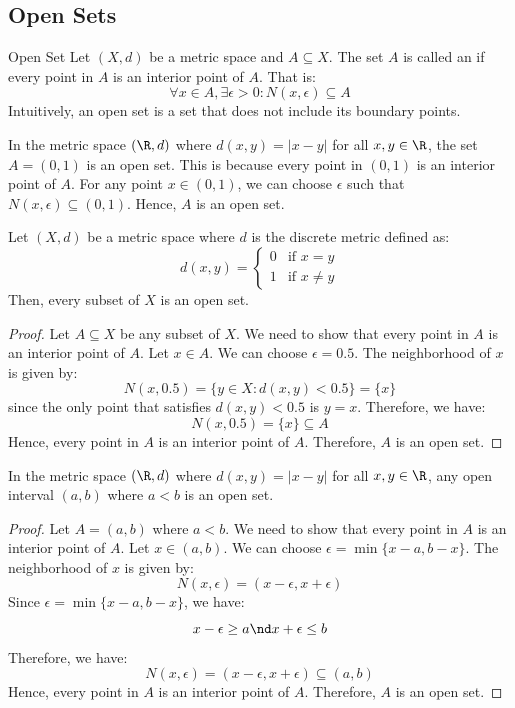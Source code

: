 \documentclass[openany]{book}
\begin{document}
\subsection{Open Sets}
\begin{mydefinition}{Open Set}
    Let $(X, d)$ be a metric space and $A \subseteq X$. The set $A$ is called an  if every point in $A$ is an interior point of $A$. That is:
    $$\forall x \in A, \exists \epsilon > 0: N(x, \epsilon) \subseteq A$$
    Intuitively, an open set is a set that does not include its boundary points.
\end{mydefinition}
\begin{example}
    In the metric space $(\R, d)$ where $d(x, y) = |x - y|$ for all $x, y \in \R$, the set $A = (0, 1)$ is an open set. This is because every point in $(0, 1)$ is an interior point of $A$. For any point $x \in (0, 1)$, we can choose $\epsilon$ such that $N(x, \epsilon) \subseteq (0, 1)$. Hence, $A$ is an open set.
\end{example}
\begin{mytheorem}
    Let $(X, d)$ be a metric space where $d$ is the discrete metric defined as:
    $$d(x, y) = 
    \begin{cases}
        0 & \text{if } x = y \\
        1 & \text{if } x \neq y
    \end{cases}$$
    Then, every subset of $X$ is an open set.
\end{mytheorem}
\begin{proof}
    Let $A \subseteq X$ be any subset of $X$. We need to show that every point in $A$ is an interior point of $A$. Let $x \in A$. We can choose $\epsilon = 0.5$. The neighborhood of $x$ is given by:
    $$N(x, 0.5) = \{y \in X: d(x, y) < 0.5\} = \{x\}$$
    since the only point that satisfies $d(x, y) < 0.5$ is $y = x$. Therefore, we have:
    $$N(x, 0.5) = \{x\} \subseteq A$$
    Hence, every point in $A$ is an interior point of $A$. Therefore, $A$ is an open set.
\end{proof}
\begin{mytheorem}
    In the metric space $(\R, d)$ where $d(x, y) = |x - y|$ for all $x, y \in \R$, any open interval $(a, b)$ where $a < b$ is an open set.
\end{mytheorem}
\begin{proof}
    Let $A = (a, b)$ where $a < b$. We need to show that every point in $A$ is an interior point of $A$. Let $x \in (a, b)$. We can choose $\epsilon = \min\{x - a, b - x\}$. The neighborhood of $x$ is given by:
    $$N(x, \epsilon) = (x - \epsilon, x + \epsilon)$$
    Since $\epsilon = \min\{x - a, b - x\}$, we have:
    $$x - \epsilon \geq a \nd x + \epsilon \leq b$$
    Therefore, we have:
    $$N(x, \epsilon) = (x - \epsilon, x + \epsilon) \subseteq (a, b)$$
    Hence, every point in $A$ is an interior point of $A$. Therefore, $A$ is an open set.
\end{proof}
\end{document}
